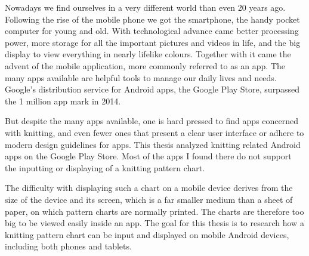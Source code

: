 Nowadays we find ourselves in a very different world than even 20 years ago.
Following the rise of the mobile phone we got the smartphone, the handy pocket
computer for young and old. With technological advance came better processing
power, more storage for all the important pictures and videos in life, and the
big display to view everything in nearly lifelike colours. Together with it came
 the advent of the mobile application, more commonly referred to as an app. The
 many apps available are helpful tools to manage our daily lives and needs.
 Google’s distribution service for Android apps, the Google Play Store,
 surpassed the 1 million app mark in 2014.

But despite the many apps available, one is hard pressed to find apps concerned
with knitting, and even fewer ones that present a clear user interface or adhere
to modern design guidelines for apps. This thesis analyzed knitting related
Android apps on the Google Play Store. Most of the apps I found there do not
support the inputting or displaying of a knitting pattern chart.

The difficulty with displaying such a chart on a mobile device derives from the
size of the device and its screen, which is a far smaller medium than a sheet of
paper, on which pattern charts are normally printed. The charts are therefore too
big to be viewed easily inside an app. The goal for this thesis is to research
how a knitting pattern chart can be input and displayed on mobile Android
devices, including both phones and tablets.


